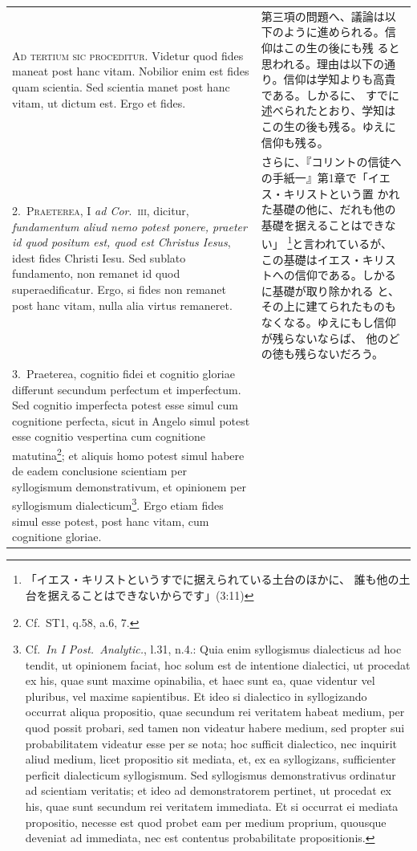 \documentclass[paper=a4paper,fontsize=10pt,jafontsize=9pt,titlepage]{jlreq}
\begin{document}
\begin{longtable}{p{21em}p{21em}}



 {\scshape Ad tertium sic proceditur}. Videtur quod fides maneat post
 hanc vitam. Nobilior enim est fides quam scientia. Sed scientia manet
 post hanc vitam, ut dictum est. Ergo et fides.

 
&

 第三項の問題へ、議論は以下のように進められる。信仰はこの生の後にも残
 ると思われる。理由は以下の通り。信仰は学知よりも高貴である。しかるに、
 すでに述べられたとおり、学知はこの生の後も残る。ゆえに信仰も残る。

\\




 2.~{\scshape Praeterea}, I {\itshape ad Cor}.~{\scshape iii},
 dicitur, {\itshape fundamentum aliud nemo potest ponere, praeter id
 quod positum est, quod est Christus Iesus}, idest fides Christi
 Iesu. Sed sublato fundamento, non remanet id quod
 superaedificatur. Ergo, si fides non remanet post hanc vitam, nulla
 alia virtus remaneret.
 
&

 さらに、『コリントの信徒への手紙一』第1章で「イエス・キリストという置
 かれた基礎の他に、だれも他の基礎を据えることはできない」
 \footnote{「イエス・キリストというすでに据えられている土台のほかに、
 誰も他の土台を据えることはできないからです」(3:11)}と言われているが、
 この基礎はイエス・キリストへの信仰である。しかるに基礎が取り除かれる
 と、その上に建てられたものもなくなる。ゆえにもし信仰が残らないならば、
 他のどの徳も残らないだろう。

\\



3.~Praeterea, cognitio fidei et cognitio gloriae differunt secundum
perfectum et imperfectum. Sed cognitio imperfecta potest esse simul
cum cognitione perfecta, sicut in Angelo simul potest esse cognitio
vespertina cum cognitione matutina\footnote{Cf.~ST1, q.58, a.6, 7.};
et aliquis homo potest simul habere de eadem conclusione scientiam per
syllogismum demonstrativum, et opinionem per syllogismum
dialecticum\footnote{Cf.~{\itshape In I Post.~Analytic.}, l.31, n.4.:
Quia enim syllogismus dialecticus ad hoc tendit, ut opinionem faciat,
hoc solum est de intentione dialectici, ut procedat ex his, quae sunt
maxime opinabilia, et haec sunt ea, quae videntur vel pluribus, vel
maxime sapientibus. Et ideo si dialectico in syllogizando occurrat
aliqua propositio, quae secundum rei veritatem habeat medium, per quod
possit probari, sed tamen non videatur habere medium, sed propter sui
probabilitatem videatur esse per se nota; hoc sufficit dialectico, nec
inquirit aliud medium, licet propositio sit mediata, et, ex ea
syllogizans, sufficienter perficit dialecticum syllogismum. Sed
syllogismus demonstrativus ordinatur ad scientiam veritatis; et ideo
ad demonstratorem pertinet, ut procedat ex his, quae sunt secundum rei
veritatem immediata. Et si occurrat ei mediata propositio, necesse est
quod probet eam per medium proprium, quousque deveniat ad immediata,
nec est contentus probabilitate propositionis.}. Ergo etiam fides
simul esse potest, post hanc vitam, cum cognitione gloriae.
 

\end{longtable}
\end{document}
